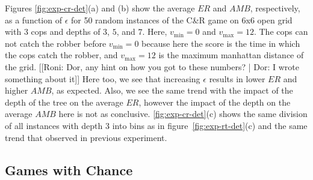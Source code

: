 \documentclass[letterpaper]{article} %
\newcommand{\vmax}{v_{\text{max}}}
\newcommand{\vmin}{v_{\text{min}}}
\newcommand{\amb}{\mathit{AMB}}
\newcommand{\er}{\mathit{ER}}
\begin{document}
Figures \ref{fig:exp-cr-det}(a) and (b) show the average $\er$ and $\amb$, respectively, as a function of  $\epsilon$ for 50 random instances of the C\&R game on 6x6 open grid with 3 cops and depths of $3$, $5$, and $7$. Here, $\vmin=0$ and $\vmax=12$. The cops can not catch the robber before $\vmin=0$ because here the score is the time in which the cops catch the robber, and $\vmax=12$ is the maximum manhattan distance of the grid.
[[Roni: Dor, any hint on how you got to these numbers? | Dor: I wrote something about it]] Here too, we see that increasing $\epsilon$ results in lower $\er$ and higher $\amb$, as expected. Also, we see the same trend with the impact of the depth of the tree on the average $\er$, however the impact of the depth  on the average $\amb$
here is not as conclusive. \ref{fig:exp-cr-det}(c) shows the same division of all instances with depth 3 into bins as in figure~\ref{fig:exp-rt-det}(c) and the same trend that observed in previous experiment. 

\subsection{Games with Chance}

\end{document}

